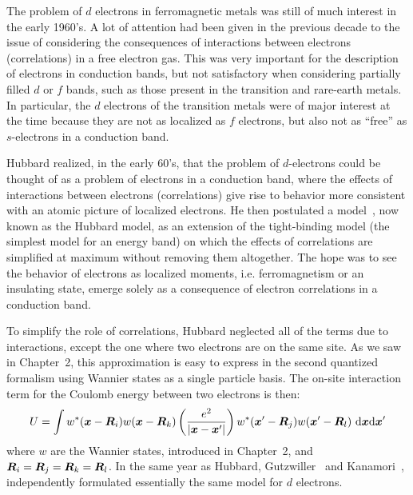 
The problem of $d$ electrons in ferromagnetic metals  was still of much
interest in the early 1960's.    A lot of attention had been given in the
previous decade to the issue of considering the consequences of interactions
between electrons (correlations) in a free electron gas.  This was very
important for the description of electrons in conduction bands, but not
satisfactory when considering partially filled $d$ or $f$ bands, such as those
present in the transition and rare-earth metals.    In particular, the $d$
electrons of the transition metals  were of major interest at the time because
they are not as localized as $f$ electrons, but also not as ``free'' as
$s$-electrons in a conduction band.  

Hubbard realized, in the early 60's, that the problem of $d$-electrons could be
thought of as a problem of electrons in a conduction band, where the effects of
interactions between electrons (correlations) give rise to behavior more
consistent with an atomic picture of localized electrons. He then postulated a
model~\cite{Hubbard26111963}, now known as the Hubbard model,  as an extension
of the tight-binding model (the simplest model for an energy band) on which the
effects of correlations are simplified at maximum without removing them
altogether.   The hope was to see the behavior of electrons as localized
moments, i.e. ferromagnetism or an insulating state, emerge solely as a
consequence of electron correlations in a conduction band. 

To simplify the role of correlations, Hubbard neglected all of the terms due to
interactions, except the one where two electrons are on the same site.  As we
saw in Chapter~2, this approximation is easy to express in the second quantized
formalism using Wannier states as a single particle basis.  The on-site
interaction term for the Coulomb energy between two electrons is then:
\begin{equation}
U =  \int 
      w^{*}( \bm{x} - \bm{R}_{i} )
      w( \bm{x} - \bm{R}_{k} )
 \left( \frac{ e^{2} }{ | \bm{x} - \bm{x}' | } \right) 
      w^{*}( \bm{x}' - \bm{R}_{j} )
      w( \bm{x}' - \bm{R}_{l} )
 \ \mathrm{d}\bm{x}\mathrm{d}\bm{x}'
\end{equation}
where $w$ are the Wannier states, introduced in Chapter~2, and $\bm{R}_{i} =
\bm{R}_{j} = \bm{R}_{k} = \bm{R}_{l}$.  In the same year as Hubbard,
Gutzwiller~\cite{PhysRevLett.10.159} and Kanamori~\cite{Kanamori01091963},
independently formulated essentially the same model for $d$ electrons. 

